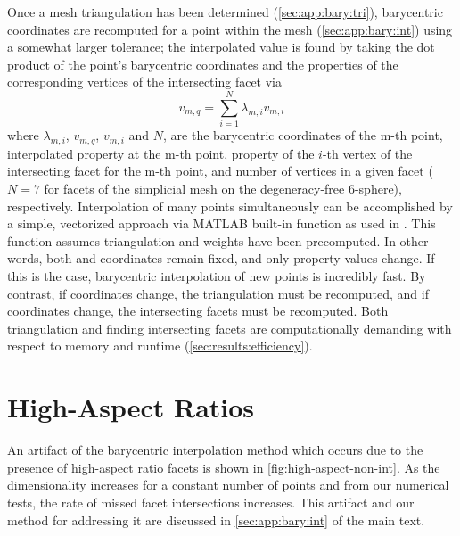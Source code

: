 \documentclass[final,12pt]{elsarticle}
\begin{document}
Once a mesh triangulation has been determined (\cref{sec:app:bary:tri}), barycentric coordinates are recomputed for a \outpt{} point within the \inpt{} mesh (\cref{sec:app:bary:int}) using a somewhat larger tolerance; the interpolated value is found by taking the dot product of the \outpt{} point's barycentric coordinates and the properties of the corresponding vertices of the intersecting facet via
\begin{equation}
	\label{eq:bary-interp}
	v_{m,q}=\underset{i=1}{\overset{N}{\sum }}\lambda _{m,i} v_{m,i}
\end{equation}
where $\lambda_{m,i}$, $v_{m,q}$, $v_{m,i}$ and $N$, are the barycentric coordinates of the m-th \outpt{} point, interpolated property at the m-th \outpt{} point, property of the $i$-th vertex of the intersecting facet for the m-th \outpt{} point, and number of vertices in a given facet ($N = 7$ for facets of the simplicial mesh on the degeneracy-free 6-sphere), respectively. Interpolation of many \outpt{} points simultaneously can be accomplished by a simple, vectorized approach via MATLAB built-in function  as used in . This function assumes triangulation and weights have been precomputed. In other words, both \inpt{} and \outpt{} coordinates remain fixed, and only \inpt{} property values change. If this is the case, barycentric interpolation of new points is incredibly fast. By contrast, if \inpt{} coordinates change, the triangulation must be recomputed, and if \outpt{} coordinates change, the intersecting facets must be recomputed. Both triangulation and finding intersecting facets are computationally demanding with respect to memory and runtime (\cref{sec:results:efficiency}).

\section{High-Aspect Ratios}
\label{sec:supp:bary:artifact}
An artifact of the barycentric interpolation method which occurs due to the presence of high-aspect ratio facets is shown in \cref{fig:high-aspect-non-int}. As the dimensionality increases for a constant number of points and from our numerical tests, the rate of missed facet intersections increases. This artifact and our method for addressing it are discussed in \cref{sec:app:bary:int} of the main text.
\end{document}
